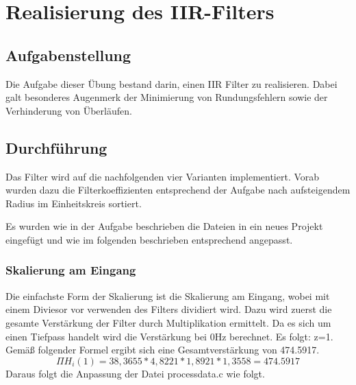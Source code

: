 \chapter{Realisierung des IIR-Filters}\label{Cha:RealIIR}
\section{Aufgabenstellung}
Die Aufgabe dieser Übung bestand darin, einen IIR Filter zu realisieren. Dabei galt besonderes Augenmerk der Minimierung von Rundungsfehlern sowie der Verhinderung von Überläufen.
\section{Durchf\"uhrung}
Das Filter wird auf die nachfolgenden vier Varianten implementiert. Vorab wurden dazu die Filterkoeffizienten entsprechend der Aufgabe nach aufsteigendem Radius im Einheitskreis sortiert.

Es wurden wie in der Aufgabe beschrieben die Dateien in ein neues Projekt eingefügt und wie im folgenden beschrieben entsprechend angepasst.
\subsection{Skalierung am Eingang}
Die einfachste Form der Skalierung ist die Skalierung am Eingang, wobei mit einem Diviesor vor verwenden des Filters dividiert wird. Dazu wird zuerst die gesamte Verstärkung der Filter durch Multiplikation ermittelt.
Da es sich um einen Tiefpass handelt wird die Verstärkung bei 0Hz berechnet. Es folgt: z=1.
Gemäß folgender Formel ergibt sich eine Gesamtverstärkung von 474.5917.
\begin{equation}
\Pi H_i(1)=38,3655*4,8221*1,8921*1,3558=474.5917
\end{equation}
Daraus folgt die Anpassung der Datei process\textunderscore data.c wie folgt.\\

